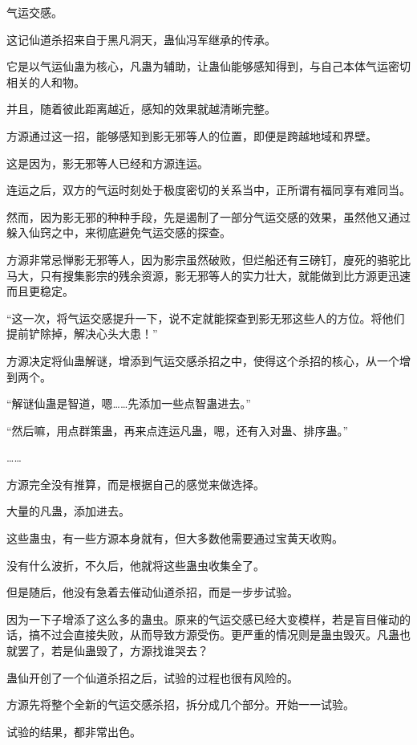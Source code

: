 
\begin{this_body}

气运交感。

这记仙道杀招来自于黑凡洞天，蛊仙冯军继承的传承。

它是以气运仙蛊为核心，凡蛊为辅助，让蛊仙能够感知得到，与自己本体气运密切相关的人和物。

并且，随着彼此距离越近，感知的效果就越清晰完整。

方源通过这一招，能够感知到影无邪等人的位置，即便是跨越地域和界壁。

这是因为，影无邪等人已经和方源连运。

连运之后，双方的气运时刻处于极度密切的关系当中，正所谓有福同享有难同当。

然而，因为影无邪的种种手段，先是遏制了一部分气运交感的效果，虽然他又通过躲入仙窍之中，来彻底避免气运交感的探查。

方源非常忌惮影无邪等人，因为影宗虽然破败，但烂船还有三磅钉，廋死的骆驼比马大，只有搜集影宗的残余资源，影无邪等人的实力壮大，就能做到比方源更迅速而且更稳定。

“这一次，将气运交感提升一下，说不定就能探查到影无邪这些人的方位。将他们提前铲除掉，解决心头大患！”

方源决定将仙蛊解谜，增添到气运交感杀招之中，使得这个杀招的核心，从一个增到两个。

“解谜仙蛊是智道，嗯……先添加一些点智蛊进去。”

“然后嘛，用点群策蛊，再来点连运凡蛊，嗯，还有入对蛊、排序蛊。”

……

方源完全没有推算，而是根据自己的感觉来做选择。

大量的凡蛊，添加进去。

这些蛊虫，有一些方源本身就有，但大多数他需要通过宝黄天收购。

没有什么波折，不久后，他就将这些蛊虫收集全了。

但是随后，他没有急着去催动仙道杀招，而是一步步试验。

因为一下子增添了这么多的蛊虫。原来的气运交感已经大变模样，若是盲目催动的话，搞不过会直接失败，从而导致方源受伤。更严重的情况则是蛊虫毁灭。凡蛊也就罢了，若是仙蛊毁了，方源找谁哭去？

蛊仙开创了一个仙道杀招之后，试验的过程也很有风险的。

方源先将整个全新的气运交感杀招，拆分成几个部分。开始一一试验。

试验的结果，都非常出色。


\end{this_body}
